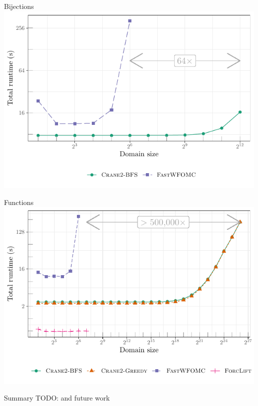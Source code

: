 \documentclass{beamer}
\begin{document}
\begin{frame}{Bijections}
  \centering
  \includegraphics{bijections.pdf}
\end{frame}

\begin{frame}{Functions}
  \centering
  \includegraphics{functions.pdf}
\end{frame}

\begin{frame}{Summary}
  TODO: and future work
\end{frame}
\end{document}
